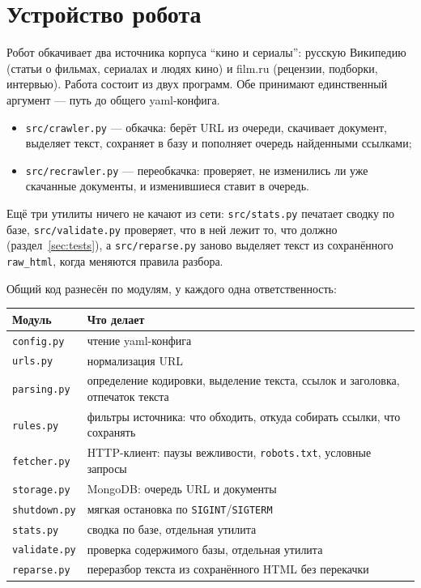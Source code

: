 \section{Устройство робота}

Робот обкачивает два источника корпуса \enquote{кино и сериалы}: русскую Википедию
(статьи о фильмах, сериалах и людях кино) и film.ru (рецензии, подборки, интервью).
Работа состоит из двух программ. Обе принимают единственный аргумент --- путь до
общего yaml-конфига.

\begin{itemize}
    \item \texttt{src/crawler.py} --- обкачка: берёт URL из очереди, скачивает
          документ, выделяет текст, сохраняет в базу и пополняет очередь
          найденными ссылками;
    \item \texttt{src/recrawler.py} --- переобкачка: проверяет, не изменились ли уже
          скачанные документы, и изменившиеся ставит в очередь.
\end{itemize}

Ещё три утилиты ничего не качают из сети: \texttt{src/stats.py} печатает сводку по
базе, \texttt{src/validate.py} проверяет, что в ней лежит то, что должно
(раздел~\ref{sec:tests}), а \texttt{src/reparse.py} заново выделяет текст из
сохранённого \texttt{raw\_html}, когда меняются правила разбора.

Общий код разнесён по модулям, у каждого одна ответственность:

\begin{center}
\begin{tabular}{|l|p{11cm}|}
\hline
\textbf{Модуль} & \textbf{Что делает} \\
\hline
\texttt{config.py}   & чтение yaml-конфига \\
\texttt{urls.py}     & нормализация URL \\
\texttt{parsing.py}  & определение кодировки, выделение текста, ссылок и заголовка, отпечаток текста \\
\texttt{rules.py}    & фильтры источника: что обходить, откуда собирать ссылки, что сохранять \\
\texttt{fetcher.py}  & HTTP-клиент: паузы вежливости, \texttt{robots.txt}, условные запросы \\
\texttt{storage.py}  & MongoDB: очередь URL и документы \\
\texttt{shutdown.py} & мягкая остановка по \texttt{SIGINT}/\texttt{SIGTERM} \\
\texttt{stats.py}    & сводка по базе, отдельная утилита \\
\texttt{validate.py} & проверка содержимого базы, отдельная утилита \\
\texttt{reparse.py}  & переразбор текста из сохранённого HTML без перекачки \\
\hline
\end{tabular}
\end{center}

